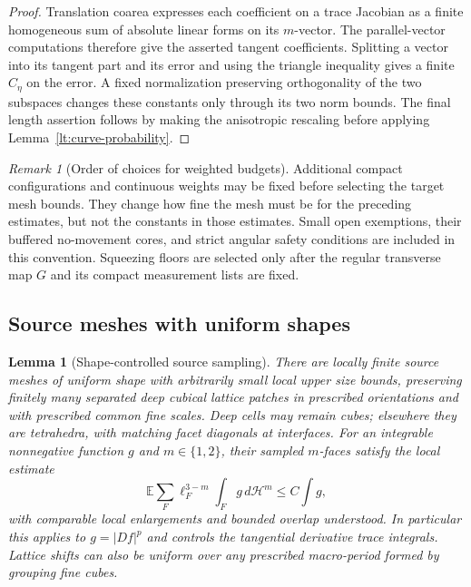 \documentclass[11pt]{article}
\numberwithin{equation}{section}
\newtheorem{lemma}[theorem]{Lemma}
\theoremstyle{definition}
\theoremstyle{remark}
\newtheorem{remark}[theorem]{Remark}
\newcommand{\cH}{\mathcal H}
\begin{document}
\begin{proof}
Translation coarea expresses each coefficient on a trace
Jacobian as a finite homogeneous sum of absolute linear forms
on its $m$-vector.  The parallel-vector computations therefore
give the asserted tangent coefficients.  Splitting a vector
into its tangent part and its error and using the triangle
inequality gives a finite $C_\eta$ on the error.  A fixed
normalization preserving orthogonality of the two subspaces
changes these constants only through its two norm bounds.
The final length assertion follows by making the anisotropic
rescaling before applying Lemma~\ref{lt:curve-probability}.
\end{proof}

\begin{remark}[Order of choices for weighted budgets]
\label{lt:weighted-order}
Additional compact configurations and continuous weights may be
fixed before selecting the target mesh bounds.  They change how
fine the mesh must be for the preceding estimates, but not the
constants in those estimates.  Small open exemptions, their
buffered no-movement cores, and strict angular safety conditions
are included in this convention.  Squeezing floors are selected
only after the regular transverse map $G$ and its compact
measurement lists are fixed.
\end{remark}

\subsection{Source meshes with uniform shapes}

\begin{lemma}[Shape-controlled source sampling]
\label{lt:source-mesh}
There are locally finite source meshes of uniform shape with
arbitrarily small local upper size bounds, preserving finitely
many separated deep cubical lattice patches in prescribed
orientations and with prescribed common fine scales.  Deep
cells may remain cubes; elsewhere they are tetrahedra, with
matching facet diagonals at interfaces.  For an integrable
nonnegative function $g$ and $m\in\{1,2\}$, their sampled
$m$-faces satisfy the local estimate
\begin{equation}
 \mathbb E\sum_F \ell_F^{3-m}\int_F g\,d\cH^m
                    \leq C\int g,
 \label{lt:source-fubini}
\end{equation}
with comparable local enlargements and bounded overlap understood.
In particular this applies to $g=|Df|^p$ and controls the
tangential derivative trace integrals.  Lattice shifts can also
be uniform over any prescribed macro-period formed by grouping
fine cubes.
\end{lemma}
\end{document}
